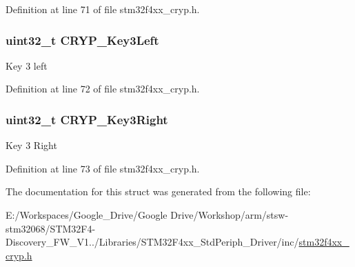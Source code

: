 Definition at line 71 of file stm32f4xx\-\_\-cryp.\-h.

\hypertarget{struct_c_r_y_p___key_init_type_def_abc13841eebf8bd578a408b7c4ea1fb94}{
\subsubsection[{C\-R\-Y\-P\-\_\-\-Key3\-Left}]{\setlength{\rightskip}{0pt plus 5cm}uint32\-\_\-t C\-R\-Y\-P\-\_\-\-Key3\-Left}}\label{struct_c_r_y_p___key_init_type_def_abc13841eebf8bd578a408b7c4ea1fb94}
Key 3 left 

Definition at line 72 of file stm32f4xx\-\_\-cryp.\-h.

\hypertarget{struct_c_r_y_p___key_init_type_def_a5863a834aaae2bd010fdee6663cb64b7}{
\subsubsection[{C\-R\-Y\-P\-\_\-\-Key3\-Right}]{\setlength{\rightskip}{0pt plus 5cm}uint32\-\_\-t C\-R\-Y\-P\-\_\-\-Key3\-Right}}\label{struct_c_r_y_p___key_init_type_def_a5863a834aaae2bd010fdee6663cb64b7}
Key 3 Right 

Definition at line 73 of file stm32f4xx\-\_\-cryp.\-h.



The documentation for this struct was generated from the following file\-:\begin{DoxyCompactItemize}
\item 
E\-:/\-Workspaces/\-Google\-\_\-\-Drive/\-Google Drive/\-Workshop/arm/stsw-\/stm32068/\-S\-T\-M32\-F4-\/\-Discovery\-\_\-\-F\-W\-\_\-\-V1../\-Libraries/\-S\-T\-M32\-F4xx\-\_\-\-Std\-Periph\-\_\-\-Driver/inc/\hyperlink{stm32f4xx__cryp_8h}{stm32f4xx\-\_\-cryp.\-h}\end{DoxyCompactItemize}
